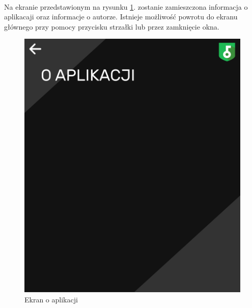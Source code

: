\documentclass[a4paper]{article}
\begin{document}
\paragraph{}Na ekranie przedstawionym na rysunku \ref{fig:oAplikacj}. zostanie zamieszczona informacja o aplikacaji oraz informacje o autorze. Istnieje możliwość powrotu do ekranu głównego przy pomocy przycisku strzałki lub przez zamknięcie okna.
\begin{figure}[H]
    \centering
    \includegraphics[height=1\textwidth]{img/ekran_o_aplikacji.png}
    \caption{Ekran o aplikacji}
    \label{fig:oAplikacj}
\end{figure}

\newpage
\end{document}
